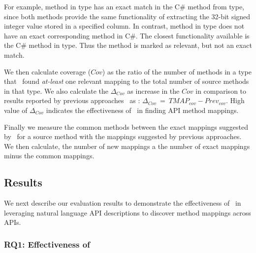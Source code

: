 For example,  method in  type has an exact match in the C\# method  from  type, since both methods provide the same functionality of extracting the 32-bit signed integer value stored in a specified column.
In contrast,  method in  type does not have an exact corresponding method in C\#. The closest functionality available is the C\# method  in  type. 
Thus the method  is marked as relevant, but not an exact match.


We then calculate coverage ($Cov$) as the ratio of the number of methods in a type that \tool\ found \textit{at-least} one relevant mapping to the total number of source methods in that type.
We also calculate the $\Delta_{Cov}$ as increase in the $Cov$ in comparison to results reported by previous approaches~\cite{Gokhale2013ICSE,nguyen2014statistical} as : $\Delta_{Cov}\ =\  TMAP_{cov} - Prev_{cov}$.
High value of $\Delta_{Cov}$ indicates the effectiveness of \tool\ in finding API method mappings.

Finally we measure the common methods between the exact mappings suggested by \tool\ for a source method with the mappings suggested by previous approaches.
We then calculate, the number of new mappings a the number of exact mappings minus the common mappings.

\subsection {Results}

We next describe our evaluation results to demonstrate the effectiveness of \tool\ in leveraging natural language API descriptions to discover method mappings across APIs.

\subsubsection{RQ1: Effectiveness of \tool\ }

